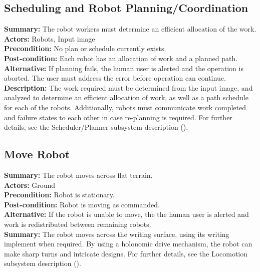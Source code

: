 \subsection{Scheduling and Robot Planning/Coordination}
\textbf{Summary:} The robot workers must determine an efficient allocation of the work. \\
\textbf{Actors:} Robots, Input image \\
\textbf{Precondition:} No plan or schedule currently exists. \\
\textbf{Post-condition:} Each robot has an allocation of work and a planned path. \\
\textbf{Alternative:} If planning fails, the human user is alerted and the operation is aborted. The user must address the error before operation can continue.\\
\textbf{Description:} The work required must be determined from the input image, and analyzed to determine an efficient allocation of work, as well as a path schedule for each of the robots. Additionally, robots must communicate work completed and failure states to each other in case re-planning is required. For further details, see the Scheduler/Planner subsystem description ().\\

\subsection{Move Robot}
\textbf{Summary:} The robot moves across flat terrain. \\
\textbf{Actors:} Ground \\
\textbf{Precondition:} Robot is stationary. \\
\textbf{Post-condition:} Robot is moving as commanded. \\
\textbf{Alternative:} If the robot is unable to move, the the human user is alerted and work is redistributed between remaining robots. \\
\textbf{Summary:} The robot moves across the writing surface, using its writing implement when required. By using a holonomic drive mechanism, the robot can make sharp turns and intricate designs. For further details, see the Locomotion subsystem description ().\\

